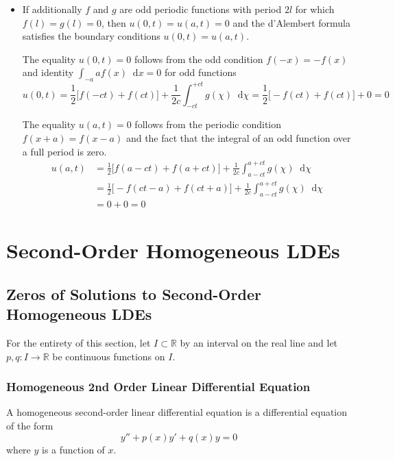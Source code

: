 \documentclass[11pt, a4paper]{article}
\newcommand{\diff}{\mathop{}\!\mathrm{d}} %
\newcommand{\R}{\mathbb{R}} %
\begin{document}
\begin{itemize}
	\item If additionally $ f $ and $ g $ are odd periodic functions with period $ 2l $ for which $ f(l) = g(l) = 0 $, then $ u(0, t) = u(a, t) = 0 $ and the d'Alembert formula satisfies the boundary conditions $ u(0, t) = u(a, t) $. 
	
	The equality $ u(0, t) = 0 $ follows from the odd condition $ f(-x) = -f(x) $ and identity $ \int_{-a}{a}f(x)\diff x = 0 $ for odd functions
	\begin{equation*}
		u(0, t) = \frac{1}{2}\big[ f(-ct) + f(ct)\big] + \frac{1}{2c} \int_{-ct}^{+ct}g(\chi)\diff \chi = \frac{1}{2}\big[-f(ct) + f(ct) \big] + 0 = 0
	\end{equation*}
	
	The equality $ u(a, t) = 0  $ follows from the periodic condition $ f(x + a) = f(x - a) $ and the fact that the integral of an odd function over a full period is zero.
	\begin{align*}
		u(a, t) &= \frac{1}{2}\big[ f(a-ct) + f(a + ct)\big] + \frac{1}{2c} \int_{a-ct}^{a+ct}g(\chi)\diff \chi\\
		&=\frac{1}{2}\big[ -f(ct-a) + f(ct+a)\big] + \frac{1}{2c} \int_{a-ct}^{a+ct}g(\chi)\diff \chi\\
		&= 0 + 0 = 0
	\end{align*}
	
	
\end{itemize}

\section{Second-Order Homogeneous LDEs}

\subsection{Zeros of Solutions to Second-Order Homogeneous LDEs}

For the entirety of this section, let $ I \subset \R $ by an interval on the real line and let $ p, q : I \to \R $ be continuous functions on $ I $.

\subsubsection{Homogeneous 2nd Order Linear 
Differential Equation}
A homogeneous second-order linear differential equation is a differential equation of the form
\begin{equation*}
	y'' + p(x) y' + q(x) y = 0
\end{equation*}
where $ y $ is a function of $ x $.
\end{document}
